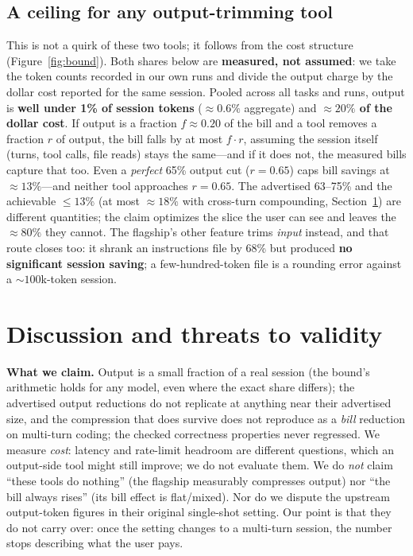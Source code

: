 \subsection{A ceiling for any output-trimming tool}
This is not a quirk of these two tools; it follows from the cost structure
(Figure~\ref{fig:bound}). Both shares below are \textbf{measured, not assumed}: we take the token counts
recorded in our own runs and divide the output charge by the dollar cost reported for the
same session. Pooled across all tasks and runs, output is \textbf{well under 1\% of session tokens}
(${\approx}0.6\%$ aggregate) and
\textbf{${\approx}20\%$ of the dollar cost}. If output is a fraction $f{\approx}0.20$ of the bill and
a tool removes a fraction $r$ of output, the bill falls by at most $f\cdot r$, assuming the session
itself (turns, tool calls, file reads) stays the same---and if it does not, the measured bills capture
that too. Even a \emph{perfect}
65\% output cut ($r{=}0.65$) caps bill savings at \textbf{${\approx}13\%$}---and neither tool
approaches $r{=}0.65$. The advertised 63--75\% and the achievable ${\le}13\%$ (at most ${\approx}18\%$ with cross-turn
compounding, Section~\ref{sec:threats}) are different
quantities; the claim optimizes the slice the user can see and leaves the ${\approx}80\%$ they cannot.
The flagship's other feature trims \emph{input} instead, and that route closes
too: it shrank an instructions file by 68\% but produced \textbf{no significant session saving}; a
few-hundred-token file is a rounding error against a ${\sim}100$k-token session.

\section{Discussion and threats to validity}
\label{sec:threats}
\textbf{What we claim.} Output is a small fraction of a real session (the bound's arithmetic
holds for any model, even where the exact share differs); the advertised output reductions do not
replicate at anything near their advertised size, and the compression that does survive does not
reproduce as a \emph{bill} reduction on multi-turn coding; the checked correctness properties never
regressed. We
measure \emph{cost}: latency and rate-limit headroom are different questions, which an output-side tool
might still improve; we do not evaluate them. We do \emph{not} claim ``these tools do nothing'' (the flagship measurably
compresses output) nor ``the bill always rises'' (its bill effect is flat/mixed). Nor do we dispute the
upstream output-token figures in their original single-shot setting. Our point is that they do not carry
over: once the setting changes to a multi-turn session, the number stops describing what the user pays.

